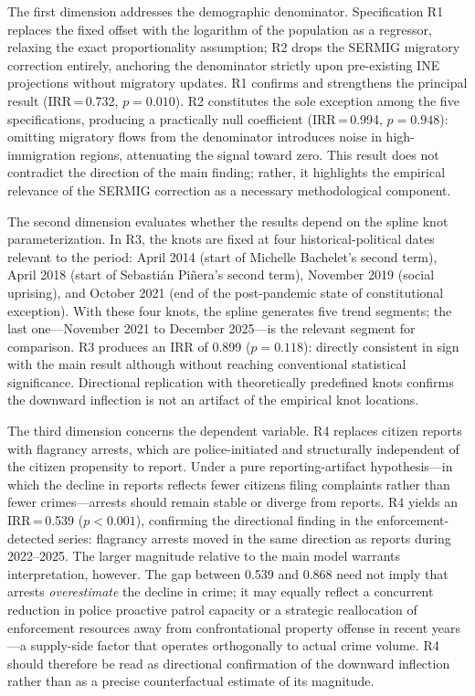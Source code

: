\documentclass[pdflatex,sn-basic]{sn-jnl}
\begin{document}
The first dimension addresses the demographic denominator. Specification R1 replaces the fixed offset with the logarithm of the population as a regressor, relaxing the exact proportionality assumption; R2 drops the SERMIG migratory correction entirely, anchoring the denominator strictly upon pre-existing INE projections without migratory updates. R1 confirms and strengthens the principal result (IRR\,=\,0.732, $p=0.010$). R2 constitutes the sole exception among the five specifications, producing a practically null coefficient (IRR\,=\,0.994, $p=0.948$): omitting migratory flows from the denominator introduces noise in high-immigration regions, attenuating the signal toward zero. This result does not contradict the direction of the main finding; rather, it highlights the empirical relevance of the SERMIG correction as a necessary methodological component.

The second dimension evaluates whether the results depend on the spline knot parameterization. In R3, the knots are fixed at four historical-political dates relevant to the period: April 2014 (start of Michelle Bachelet's second term), April 2018 (start of Sebasti\'an Pi\~nera's second term), November 2019 (social uprising), and October 2021 (end of the post-pandemic state of constitutional exception). With these four knots, the spline generates five trend segments; the last one---November 2021 to December 2025---is the relevant segment for comparison. R3 produces an IRR of 0.899 ($p=0.118$): directly consistent in sign with the main result although without reaching conventional statistical significance. Directional replication with theoretically predefined knots confirms the downward inflection is not an artifact of the empirical knot locations.

The third dimension concerns the dependent variable. R4 replaces citizen reports with flagrancy arrests, which are police-initiated and structurally independent of the citizen propensity to report. Under a pure reporting-artifact hypothesis---in which the decline in reports reflects fewer citizens filing complaints rather than fewer crimes---arrests should remain stable or diverge from reports. R4 yields an IRR\,=\,0.539 ($p<0.001$), confirming the directional finding in the enforcement-detected series: flagrancy arrests moved in the same direction as reports during 2022--2025. The larger magnitude relative to the main model warrants interpretation, however. The gap between 0.539 and 0.868 need not imply that arrests \emph{overestimate} the decline in crime; it may equally reflect a concurrent reduction in police proactive patrol capacity or a strategic reallocation of enforcement resources away from confrontational property offense in recent years---a supply-side factor that operates orthogonally to actual crime volume. R4 should therefore be read as directional confirmation of the downward inflection rather than as a precise counterfactual estimate of its magnitude.
\end{document}
